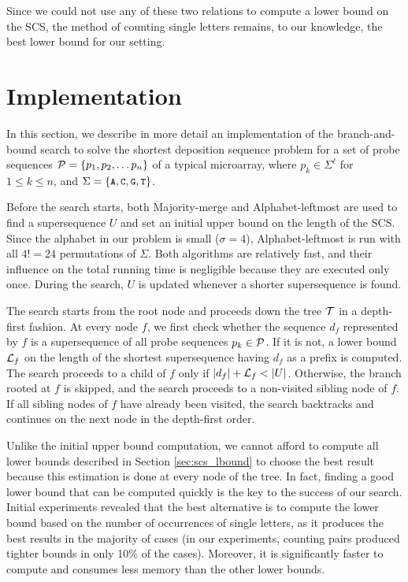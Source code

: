 Since we could not use any of these two relations to compute a lower bound on
the SCS, the method of counting single letters remains, to our knowledge, the
best lower bound for our setting.

\section{Implementation}
\label{sec:scs_implementation}

In this section, we describe in more detail an implementation of the
branch-and-bound search to solve the shortest deposition sequence problem for a
set of probe sequences ${\mathcal{P}} = \{p_1, p_2, \ldots p_n \}$ of a typical
microarray, where $p_k \in \Sigma^{\ell}$ for $1 \leq k \leq n$, and
$\Sigma = \{\text{\small{\tt A}},\text{\small{\tt C}},\text{\small{\tt G}},\text{\small{\tt T}}\}$.

Before the search starts, both Majority-merge and Alphabet-leftmost are used to
find a supersequence $U$ and set an initial upper bound on the length of the
SCS. Since the alphabet in our problem is small ($\sigma = 4$),
Alphabet-leftmost is run with all $4! = 24$ permutations of $\Sigma$. Both
algorithms are relatively fast, and their influence on the total running time is
negligible because they are executed only once. During the search, $U$ is
updated whenever a shorter supersequence is found.

The search starts from the root node and proceeds down the tree ${\mathcal{T}}$ in a
depth-first fashion. At every node $f$, we first check whether the sequence
$d_f$ represented by $f$ is a supersequence of all probe sequences
$p_k \in {\mathcal{P}}$. If it is not, a lower bound ${\mathcal{L}}_f$ on the length of the shortest
supersequence having $d_f$ as a prefix is computed. The search proceeds to a
child of $f$ only if $|d_f| + {\mathcal{L}}_f < |U|$. Otherwise, the branch rooted at $f$ is
skipped, and the search proceeds to a non-visited sibling node of $f$. If all
sibling nodes of $f$ have already been visited, the search backtracks and
continues on the next node in the depth-first order.

Unlike the initial upper bound computation, we cannot afford to compute all
lower bounds described in Section \ref{sec:scs_lbound} to choose the best result
because this estimation is done at every node of the tree. In fact, finding a
good lower bound that can be computed quickly is the key to the success of our
search. Initial experiments revealed that the best alternative is to compute the
lower bound based on the number of occurrences of single letters, as it
produces the best results in the majority of cases (in our experiments, counting
pairs produced tighter bounds in only 10\% of the cases). Moreover, it is
significantly faster to compute and consumes less memory than the other lower
bounds.

